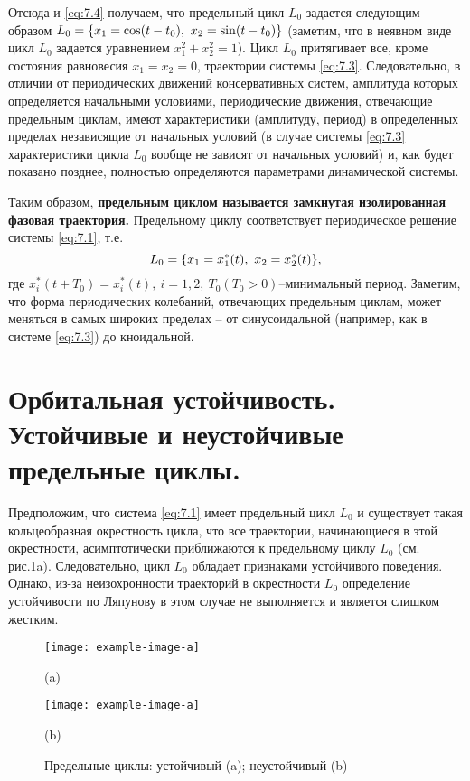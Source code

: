 Отсюда и \eqref{eq:7.4} получаем, что предельный цикл
$L_0$  задается следующим
образом $L_0 = \qty{x_1=\cos(t-t_0),~ x_2 = \sin(t-t_0)}$ (заметим, что в неявном виде цикл
$L_0$ задается уравнением $x_1^2+x_2^2=1$). Цикл
$L_0$ притягивает все, кроме состояния
равновесия $x_1=x_2=0$, траектории системы \eqref{eq:7.3}. Следовательно, в отличии от
периодических движений консервативных систем, амплитуда которых
определяется начальными условиями, периодические движения, отвечающие
предельным циклам, имеют характеристики (амплитуду, период) в
определенных пределах независящие от начальных условий (в случае системы
\eqref{eq:7.3} характеристики цикла $L_0$ вообще не зависят от начальных условий) и, как
будет показано позднее, полностью определяются параметрами динамической системы.

Таким образом, \textbf{предельным циклом называется замкнутая изолированная фазовая траектория.} 
Предельному циклу соответствует периодическое решение системы \eqref{eq:7.1}, т.е.
\begin{equation}
        \label{eq:7.7}
        L_0 = \qty{ x_1=x_1^*(t), ~ x_2=x_2^*(t)},
\end{equation}
где $x_i^* (t+T_0)= x_i^*(t),~i=1,2,~ T_0(T_0>0)$--минимальный период. Заметим, что форма 
периодических колебаний, отвечающих предельным циклам, может меняться в самых широких
пределах -- от синусоидальной (например, как в системе \eqref{eq:7.3}) до кноидальной.

\section{Орбитальная устойчивость. Устойчивые и неустойчивые предельные циклы.}%
\label{sec:7.2}

Предположим, что система \eqref{eq:7.1} имеет предельный цикл $L_0$ и существует такая кольцеобразная
окрестность цикла, что все траектории, начинающиеся в этой окрестности, асимптотически приближаются к предельному циклу $L_0$ (см. рис.\ref{fig:7.2}a). Следовательно, цикл $L_0$ обладает признаками устойчивого поведения. Однако, из-за неизохронности траекторий в окрестности $L_0$ определение устойчивости по Ляпунову в этом случае не выполняется и является слишком жестким.
\begin{figure}[h]
        \centering
        \begin{minipage}{0.49\linewidth}
               \centering
               \texttt{[image: example-image-a]} 

               (a)
        \end{minipage}
        \begin{minipage}{0.49\linewidth}
               \centering
               \texttt{[image: example-image-a]} 

               (b)
        \end{minipage}
        \caption{Предельные циклы: устойчивый (a); неустойчивый (b)}
        \label{fig:7.2}
\end{figure}

